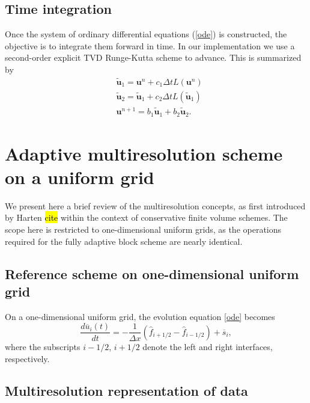 \documentclass[]{article}
\begin{document}
    \subsection{Time integration}

        Once the system of ordinary differential equations (\ref{ode}) is
        constructed, the objective is to integrate them forward in time. In our
        implementation we use a second-order explicit TVD Runge-Kutta scheme to
        advance. This is summarized by
        \begin{align}
            & \tilde{\bm{u}}_{1} = \bm{u}^{n} + c_{1} \Delta t L(\bm{u}^{n}) \\
            & \tilde{\bm{u}}_{2} = \tilde{\bm{u}}_{1} + c_{2} \Delta t L(\tilde{\bm{u}}_{1}) \\
            & \bm{u}^{n+1} = b_{1} \tilde{\bm{u}}_{1} + b_{2} \tilde{\bm{u}}_{2}.
        \end{align}

\section{Adaptive multiresolution scheme on a uniform grid}

    We present here a brief review of the multiresolution concepts, as first
    introduced by Harten \hl{cite} within the context of conservative finite
    volume schemes. The scope here is restricted to one-dimensional uniform
    grids, as the operations required for the fully adaptive block scheme are
    nearly identical.

    \subsection{Reference scheme on one-dimensional uniform grid}

        On a one-dimensional uniform grid, the evolution equation \ref{ode} becomes
        \begin{equation}
            \frac{d \overline{u}_{i}(t)}{dt} = -\frac{1}{\Delta x} \left( \hat{f}_{i+1/2} -
            \hat{f}_{i-1/2} \right) + \overline{s}_{i},
        \end{equation}
        where the subscripts $i-1/2$, $i+1/2$ denote the left and right interfaces, respectively.

        \subsection{Multiresolution representation of data}
\end{document}
